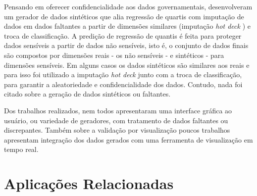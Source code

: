 \documentclass[
	12pt,				%
	openright,			%
	oneside,			%
	a4paper,			%
	english,			%
	brazil				%
	]{abntex2}
\begin{document}
		Pensando em oferecer confidencialidade aos dados governamentais, \cite{Larsen2012} desenvolveram um gerador de dados sintéticos que alia regressão de quartis com imputação de dados em dados faltantes a partir de dimensões similares (imputação \emph{hot deck} \cite{andridge2010review}) e troca de classificação.
		A predição de regressão de quantis é feita para proteger dados sensíveis a partir de dados não sensíveis,
		 isto é, o conjunto de dados finais são compostos por dimensões reais - os não sensíveis - e sintéticos - para dimensões sensíveis.
		Em alguns casos os dados sintéticos são similares aos reais e para isso foi utilizado a imputação \emph{hot deck} junto com a troca de classificação, para garantir a aleatoriedade e confidencialidade dos dados.
		Contudo, nada foi citado sobre a geração de dados sintéticos ou faltantes.
        \par
        Dos trabalhos realizados, nem todos apresentaram uma interface gráfica ao usuário, ou variedade de geradores, com tratamento de dados faltantes ou discrepantes. Também sobre a validação por visualização poucos trabalhos apresentam integração dos dados gerados com uma ferramenta de visualização em tempo real.

	\section{Aplicações Relacionadas}
\end{document}

